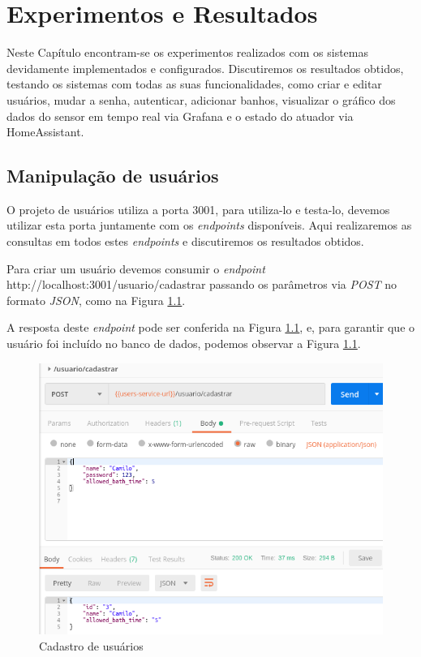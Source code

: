 \chapter{Experimentos e Resultados}

Neste Capítulo encontram-se os experimentos realizados com os sistemas devidamente implementados e configurados. Discutiremos os resultados obtidos, testando os sistemas com todas as suas funcionalidades, como criar e editar usuários, mudar a senha, autenticar, adicionar banhos, visualizar o gráfico dos dados do sensor em tempo real via Grafana e o estado do atuador via HomeAssistant.

\section{Manipulação de usuários}

O projeto de usuários utiliza a porta 3001, para utiliza-lo e testa-lo, devemos utilizar esta porta juntamente com os \textit{endpoints} disponíveis. Aqui realizaremos as consultas em todos estes \textit{endpoints} e discutiremos os resultados obtidos.

Para criar um usuário devemos consumir o \textit{endpoint} http://localhost:3001/usuario/cadastrar passando os parâmetros via \textit{POST} no formato \textit{JSON}, como na Figura \ref{fig:cadastro}.

A resposta deste \textit{endpoint} pode ser conferida na Figura \ref{fig:cadastro}, e, para garantir que o usuário foi incluído no banco de dados, podemos observar a Figura \ref{fig:cadastro}.

\begin{figure}[htbp]
	\centering
	\includegraphics[width=0.7\linewidth]{figuras/postman/cadastro.png}
	\caption{Cadastro de usuários}
	\label{fig:cadastro}
\end{figure}

